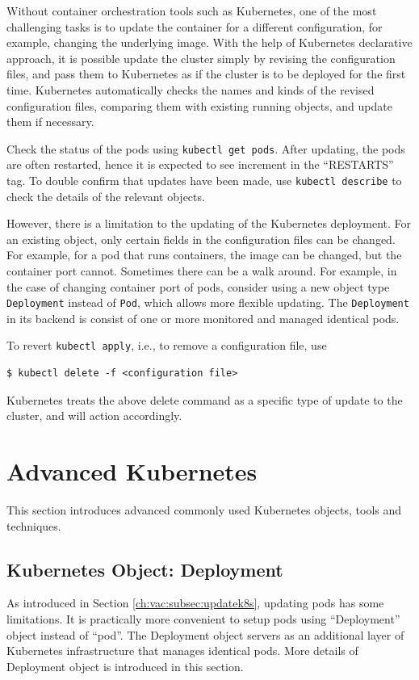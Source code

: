 Without container orchestration tools such as Kubernetes, one of the most challenging tasks is to update the container for a different configuration, for example, changing the underlying image. With the help of Kubernetes declarative approach, it is possible update the cluster simply by revising the configuration files, and pass them to Kubernetes as if the cluster is to be deployed for the first time. Kubernetes automatically checks the names and kinds of the revised configuration files, comparing them with existing running objects, and update them if necessary.

Check the status of the pods using \verb|kubectl get pods|. After updating, the pods are often restarted, hence it is expected to see increment in the ``RESTARTS'' tag. To double confirm that updates have been made, use \verb|kubectl describe| to check the details of the relevant objects.

However, there is a limitation to the updating of the Kubernetes deployment. For an existing object, only certain fields in the configuration files can be changed. For example, for a pod that runs containers, the image can be changed, but the container port cannot. Sometimes there can be a walk around. For example, in the case of changing container port of pods, consider using a new object type \verb|Deployment| instead of \verb|Pod|, which allows more flexible updating. The \verb|Deployment| in its backend is consist of one or more monitored and managed identical pods.

To revert \verb|kubectl apply|, i.e., to remove a configuration file, use
\begin{lstlisting}
$ kubectl delete -f <configuration file>
\end{lstlisting}
Kubernetes treats the above delete command as a specific type of update to the cluster, and will action accordingly.

\section{Advanced Kubernetes}

This section introduces advanced commonly used Kubernetes objects, tools and techniques.

\subsection{Kubernetes Object: Deployment} \label{ch:vac:subsec:deployment}

As introduced in Section \ref{ch:vac:subsec:updatek8s}, updating pods has some limitations. It is practically more convenient to setup pods using ``Deployment'' object instead of ``pod''. The Deployment object servers as an additional layer of Kubernetes infrastructure that manages identical pods. More details of Deployment object is introduced in this section.

